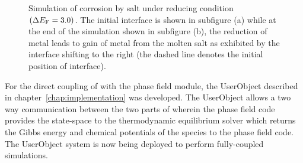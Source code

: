 \begin{figure}[!ht]
    \hfill
    \caption[ corrosion by  salt under reducing condition $\left(\Delta E_{\ce{F}} = 3.0\right)$.]{Simulation of  corrosion by  salt under reducing condition $\left(\Delta E_{\ce{F}} = 3.0\right)$. The initial interface is shown in subfigure (a) while at the end of the simulation shown in subfigure (b), the reduction of  metal leads to gain of  metal from the molten salt as exhibited by the interface shifting to the right (the dashed line denotes the initial position of interface).}
    \label{fig:pfres3}
\end{figure}

For the direct coupling of {\GEM} with the phase field module, the UserObject described in chapter~\ref{chap:implementation} was developed. The UserObject allows a two way communication between the two parts of {\YJ} wherein the phase field code provides the state-space to the thermodynamic equilibrium solver which returns the Gibbs energy and chemical potentials of the species to the phase field code. The UserObject system is now being deployed to perform fully-coupled simulations. 
       
